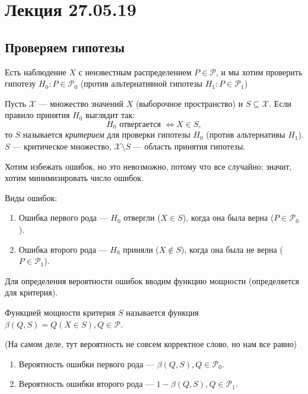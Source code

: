 \section{Лекция 27.05.19}

\subsection{Проверяем гипотезы}

Есть наблюдение \(X\) с неизвестным распределением \(P \in \mathcal{P}\), и мы хотим проверить гипотезу \(H_0: P \in \mathcal{P}_0\) (против альтернативной гипотезы \(H_1: P \in \mathcal{P}_1\))

\begin{definition}
    Пусть \(\mathcal{X}\) --- множество значений \(X\) (выборочное пространство) и \(S \subseteq \mathcal{X}\). Если правило принятия \(H_0\) выглядит так:
    \begin{displaymath}
        H_0 \text{ отвергается } \iff X \in S,
    \end{displaymath}
    то \(S\) называется \textit{критерием} для проверки гипотезы \(H_0\) (против альтернативы \(H_1\)).
    \(S\) --- критическое множество, \(\mathcal{X} \setminus S\) --- область принятия гипотезы.
\end{definition}

Хотим избежать ошибок, но это невозможно, потому что все случайно; значит, хотим минимизировать число ошибок.

Виды ошибок:
\begin{enumerate}
    \item Ошибка первого рода --- \(H_0\) отвергли (\(X \in S\)), когда она была верна (\(P \in \mathcal{P}_0\)).
    \item Ошибка второго рода --- \(H_0\) приняли (\(X \notin S\)), когда она была не верна (\(P \in \mathcal{P}_1\)).
\end{enumerate}

Для определения вероятности ошибок вводим функцию мощности (определяется для критерия).
\begin{definition}
    Функцией мощности критерия \(S\) называется функция \(\beta(Q, S) = Q(X \in S), Q \in \mathcal{P}\).
\end{definition}

(На самом деле, тут вероятность не совсем корректное слово, но нам все равно)

\begin{enumerate}
    \item Вероятность ошибки первого рода --- \(\beta(Q, S), Q \in \mathcal{P}_0\).
    \item Вероятность ошибки второго рода --- \(1 - \beta(Q, S), Q \in \mathcal{P}_1\).
\end{enumerate}

